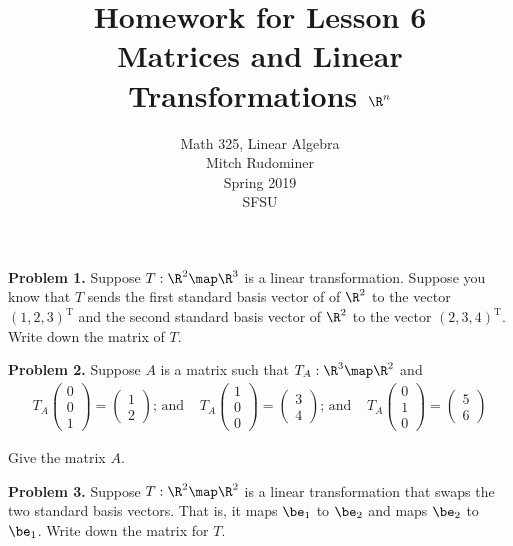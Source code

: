 \documentclass[oneside,12pt]{amsart}
\begin{document}
\title{Homework for Lesson 6 \\ Matrices and Linear Transformations $\R^n$}
\author{Math 325, Linear Algebra \\ Mitch Rudominer \\ Spring 2019 \\ SFSU }
\date{}

\maketitle

\textbf{Problem 1.} Suppose $T:\R^2\map\R^3$ is a linear transformation.
Suppose you know that $T$ sends the first standard basis vector of of $\R^2$
to the vector $(1, 2, 3)^{\text{T}}$ and the second standard basis vector
of $\R^2$ to the vector $(2,3,4)^{\text{T}}$. Write down the matrix of $T$.

\bigskip
\bigskip
\bigskip
\bigskip
\bigskip
\bigskip

\textbf{Problem 2.}  Suppose $A$ is a matrix such that $T_A:\R^3\map\R^2$ and
$$
\begin{matrix}
T_A \begin{pmatrix} 0 \\ 0 \\ 1 \end{pmatrix} = \begin{pmatrix} 1 \\ 2 \end{pmatrix}\text{; and }
&
T_A \begin{pmatrix} 1 \\ 0 \\ 0 \end{pmatrix} = \begin{pmatrix} 3 \\ 4 \end{pmatrix}\text{; and }
&
T_A \begin{pmatrix} 0 \\ 1 \\ 0 \end{pmatrix} = \begin{pmatrix} 5 \\ 6 \end{pmatrix}
\end{matrix}
$$

Give the matrix $A$.

\bigskip
\bigskip
\bigskip
\bigskip
\bigskip
\bigskip

\textbf{Problem 3.}  Suppose $T:\R^2\map\R^2$ is a linear transformation
that swaps the two standard basis vectors. That is, it
maps $\be_1$ to $\be_2$ and maps $\be_2$ to $\be_1$. Write down the matrix
for $T$.
\end{document}
